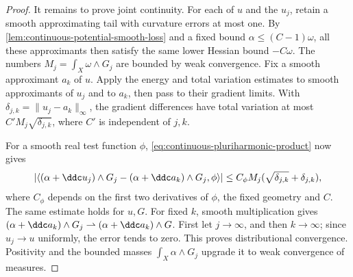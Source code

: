 \begin{proof}
It remains to prove joint continuity. For each of $u$ and the $u_j$, retain a smooth approximating tail with curvature errors at most one. By \cref{lem:continuous-potential-smooth-loss} and a fixed bound $\alpha\leq(C-1)\omega$, all these approximants then satisfy the same lower Hessian bound $-C\omega$. The numbers $M_j=\int_X\omega\wedge G_j$ are bounded by weak convergence. Fix a smooth approximant $a_k$ of $u$. Apply the energy and total variation estimates to smooth approximants of $u_j$ and to $a_k$, then pass to their gradient limits. With $\delta_{j,k}=\|u_j-a_k\|_\infty$, the gradient differences have total variation at most $C' M_j\sqrt{\delta_{j,k}}$, where $C'$ is independent of $j,k$.

For a smooth real test function $\phi$, \eqref{eq:continuous-pluriharmonic-product} now gives
\[
 \left|\left\langle(\alpha+\ddc u_j)\wedge G_j
       -(\alpha+\ddc a_k)\wedge G_j,\phi\right\rangle\right|
 \leq C_\phi M_j(\sqrt{\delta_{j,k}}+\delta_{j,k}),
\]
where $C_\phi$ depends on the first two derivatives of $\phi$, the fixed geometry and $C$. The same estimate holds for $u,G$. For fixed $k$, smooth multiplication gives $(\alpha+\ddc a_k)\wedge G_j\rightharpoonup(\alpha+\ddc a_k)\wedge G$. First let $j\to\infty$, and then $k\to\infty$; since $u_j\to u$ uniformly, the error tends to zero. This proves distributional convergence. Positivity and the bounded masses $\int_X\alpha\wedge G_j$ upgrade it to weak convergence of measures.
\end{proof}
